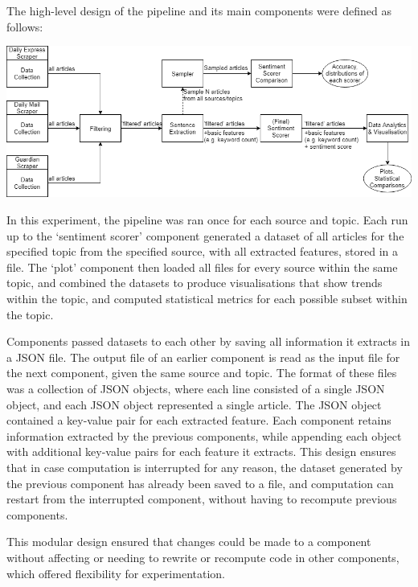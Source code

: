 \documentclass{report}
\begin{document}
The high-level design of the pipeline and its main components were defined as follows:

\vspace{0.5em}
\noindent
\includegraphics[width=\textwidth]{overall-design2.png}

In this experiment, the pipeline was ran once for each source and topic.
Each run up to the `sentiment scorer' component generated a dataset of all articles for the specified topic from the specified source, with all extracted features, stored in a file.
The `plot' component then loaded all files for every source within the same topic, and combined the datasets to produce visualisations that show trends within the topic, and computed statistical metrics for each possible subset within the topic.

Components passed datasets to each other by saving all information it extracts in a JSON file.
The output file of an earlier component is read as the input file for the next component, given the same source and topic.
The format of these files was a collection of JSON objects, where each line consisted of a single JSON object, and each JSON object represented a single article.
The JSON object contained a key-value pair for each extracted feature.
Each component retains information extracted by the previous components, while appending each object with additional key-value pairs for each feature it extracts.
This design ensures that in case computation is interrupted for any reason, the dataset generated by the previous component has already been saved to a file, and computation can restart from the interrupted component, without having to recompute previous components.

This modular design ensured that changes could be made to a component without affecting or needing to rewrite or recompute code in other components, which offered flexibility for experimentation.
\end{document}
